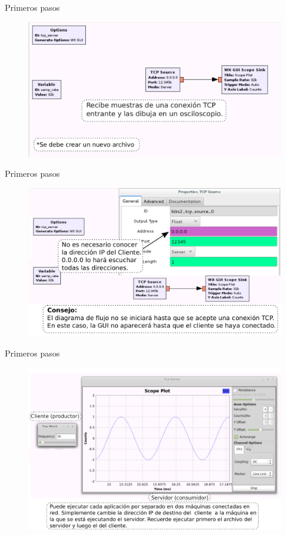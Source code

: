 \begin{frame}{Primeros pasos }
\begin{figure}[H]
\centering
\includegraphics[width=\textwidth]{parte1/lab1/pdf/lab1_25.pdf}
\end{figure}
\end{frame}

\begin{frame}{Primeros pasos }
\begin{figure}[H]
\centering
\includegraphics[width=\textwidth]{parte1/lab1/pdf/lab1_26.pdf}
\end{figure}
\end{frame}

\begin{frame}{Primeros pasos }
\begin{figure}[H]
\centering
\includegraphics[width=\textwidth, height=0.55\textwidth]{parte1/lab1/pdf/lab1_27.pdf}
\end{figure}
\end{frame}


